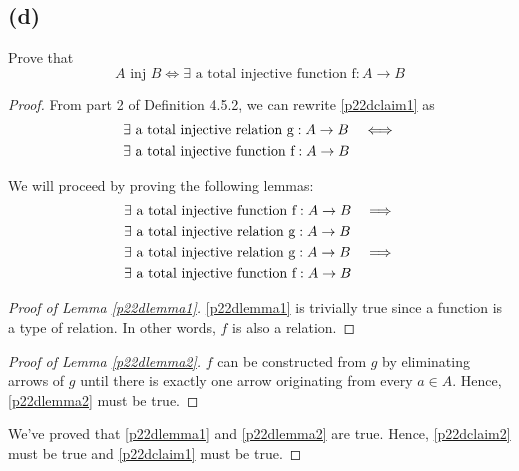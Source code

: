 \documentclass{article}
\newcommand{\inj}{\text{ inj }}
\newenvironment{subproof}[1][\proofname]{%
	\renewcommand{\qedsymbol}{$\blacksquare$}%
	\begin{proof}[#1]%
	}{%
	\end{proof}%
}
\begin{document}
\subsection{(d)}
Prove that
\begin{equation}\label{p22dclaim1}
	A \inj B \iff \exists \text{ a total injective function f} : A \rightarrow B
\end{equation}
\begin{proof}
	From part 2 of Definition 4.5.2, we can rewrite \eqref{p22dclaim1} as
	\begin{align}
		 & \exists \text{ a total injective relation g} : A \rightarrow B & \iff \notag \\ &\exists \text{ a total injective function f} : A \rightarrow B& \label{p22dclaim2}
	\end{align}

	We will proceed by proving the following lemmas:
	\begin{align}
		 & \exists \text{ a total injective function f} : A \rightarrow B & \implies \notag \\ &\exists \text{ a total injective relation g} : A \rightarrow B& \label{p22dlemma1} \\
		 & \exists \text{ a total injective relation g} : A \rightarrow B & \implies \notag \\ &\exists \text{ a total injective function f} : A \rightarrow B& \label{p22dlemma2}
	\end{align}

	\begin{subproof}[Proof of Lemma \eqref{p22dlemma1}]
		\eqref{p22dlemma1} is trivially true since a function is a type of relation.  In other words, $f$ is also a relation.
	\end{subproof}

	\begin{subproof}[Proof of Lemma \eqref{p22dlemma2}]
		$f$ can be constructed from $g$ by eliminating arrows of $g$ until there is exactly one arrow originating from every $a \in A$.  Hence, \eqref{p22dlemma2} must be true.
	\end{subproof}

	We've proved that \eqref{p22dlemma1} and \eqref{p22dlemma2} are true. Hence, \eqref{p22dclaim2} must be true and \eqref{p22dclaim1} must be true.

\end{proof}
\end{document}
